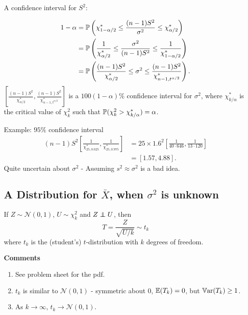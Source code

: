 \documentclass[10pt, a4paper]{article}
\begin{document}
A confidence interval for $S ^ 2$:
\begin{proposition}
    \begin{align*}
        1 - \alpha &= \P\left(\chi_{1 - \alpha / 2}^{*} \leq \frac{(n - 1)S ^ 2}{\sigma ^ 2} \leq \chi_{\alpha / 2}^{*}\right) \\
        &= \P\left(\frac{1}{\chi_{\alpha / 2}^{*}} \leq \frac{\sigma ^ 2}{(n - 1)S ^ 2} \leq \frac{1}{\chi_{1 - \alpha / 2}^{*}}\right) \\
        &= \P\left(\frac{(n - 1)S ^ 2}{\chi_{\alpha / 2}^{*}} \leq \sigma ^ 2 \leq \frac{(n - 1)S ^ 2}{\chi_{n - 1, t ^ {\alpha / 2}}^{*}}\right).
    \end{align*}
    $\left[\frac{(n - 1)S ^ 2}{\chi_{\alpha / 2}^{*}}, \frac{(n - 1)S ^ 2}{\chi_{n - 1, t ^ {\alpha / 2}}^{*}}\right]$ is a $100(1 - \alpha)\%$ confidence interval for $\sigma ^ 2$,
    where $\chi_{k / \alpha}^{*}$ is the critical value of $\chi_{k}^{2}$ such that $\P(\chi_{k}^{2} > \chi_{k / \alpha}^{*}) = \alpha$.
\end{proposition}

Example:
$95\%$ confidence interval
\begin{align*}
    (n - 1)S ^ 2\left[\frac{1}{\chi_{25, 0.025}^{*}}, \frac{1}{\chi_{25, 0.975}^{*}}\right] &= 25 \times 1.6 ^ 2\left[\frac{1}{40 \cdot 646}, \frac{1}{13 \cdot 120}\right] \\
    &= [1.57, 4.88].
\end{align*}
Quite uncertain about $\sigma ^ 2$ -
Assuming $s ^ 2 \approx \sigma ^ 2$ is a bad idea.

\subsection{A Distribution for \texorpdfstring{$\bar{X}$}{},
when \texorpdfstring{$\sigma ^ 2$}{} is unknown}

\begin{definition}
    If $Z \sim \mathcal{N}(0, 1)$,
    $U \sim \chi_{k}^{2}$ and $Z \independent U$,
    then
    \[
    T = \frac{Z}{\sqrt{U / k}} \sim t_{k}
    \]
    where $t_{k}$ is the
    (student's)
    $t$-distribution with $k$ degrees of freedom.
\end{definition}

\textbf{Comments}
\begin{enumerate}[label = (\roman*)]
    \item See problem sheet for the pdf.

    \item $t_k$ is similar to $\mathcal{N}(0, 1)$ -
    symmetric about $0$,
    $\E(T_k) = 0$,
    but $\Var(T_k) \geq 1$.

    \item As $k \to \infty$,
    $t_k \to \mathcal{N}(0, 1)$.
\end{enumerate}
\end{document}
